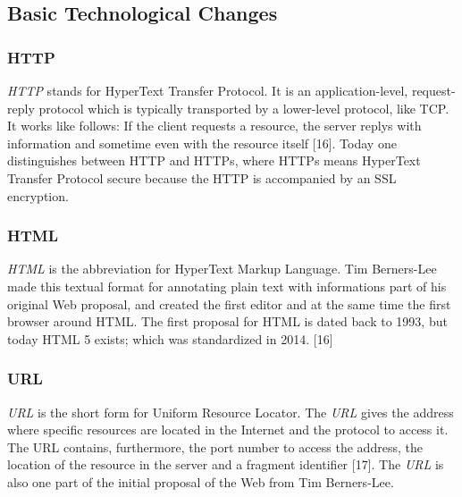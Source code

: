 \documentclass[runningheads]{llncs}
\begin{document}
			\subsection{Basic Technological Changes}
		\subsubsection{HTTP}
		\leavevmode\newline
		\textit{HTTP} stands for HyperText Transfer Protocol. It is an application-level, request-reply protocol which is typically transported by a lower-level protocol, like TCP. It works like follows: If the client requests a resource, the server replys with information and sometime even with the resource itself [16]. Today one distinguishes between HTTP and HTTPs, where HTTPs means HyperText Transfer Protocol secure because the HTTP is accompanied by an SSL encryption.
		\subsubsection{HTML}
		\leavevmode\newline
		\textit{HTML} is the abbreviation for HyperText Markup Language. Tim Berners-Lee made this textual format for annotating plain text with informations part of his original Web proposal, and created the first editor and at the same time the first browser around HTML. The first proposal for HTML is dated back to 1993, but today HTML 5 exists; which was standardized in 2014. [16]
		\subsubsection{URL}
		\leavevmode\newline
		\textit{URL} is the short form for Uniform Resource Locator. The \textit{URL} gives the address where specific resources are located in the Internet and the protocol to access it. The URL contains, furthermore, the port number to access the address, the location of the resource in the server and a fragment identifier [17]. The \textit{URL} is also one part of the initial proposal of the Web from Tim Berners-Lee. 
\end{document}
